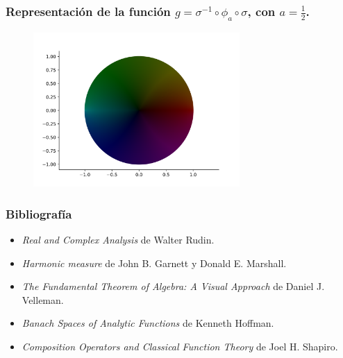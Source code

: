 \documentclass[spanish, a4paper, 12pt, final, slideColor, nototal, colorBG, pdf, noaccumulate, darkblue]{beamer}
\begin{document}
\begin{frame}
    \frametitle{Representación de la función $g = \sigma^{-1} \circ \phi_a \circ \sigma$, con $a = \frac{1}{2}$.}
    \begin{figure}[!htbp]
        \centering
        \includegraphics[width=0.7\textwidth]{../Aplicacion/lente.png}
        \label{fig:lente}
    \end{figure}
\end{frame}

\begin{frame}
    \frametitle{Bibliografía}
    \begin{itemize}
        \item \textit{Real and Complex Analysis} de Walter Rudin.
        \item \textit{Harmonic measure} de John B. Garnett y Donald E. Marshall.
        \item \textit{The Fundamental Theorem of Algebra: A Visual Approach} de Daniel J. Velleman.
        \item \textit{Banach Spaces of Analytic Functions} de Kenneth Hoffman.
        \item \textit{Composition Operators and Classical Function Theory} de Joel H. Shapiro.
    \end{itemize}
\end{frame}
\end{document}
